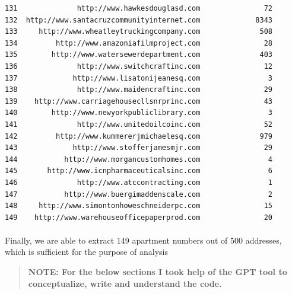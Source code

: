 \documentclass[
  12pt,
]{article}
\makeatletter
\let\oldparagraph\paragraph
\renewcommand{\paragraph}{
    \@ifstar
      \xxxParagraphStar
      \xxxParagraphNoStar
  }
\newcommand{\xxxParagraphStar}[1]{\oldparagraph*{#1}\mbox{}}
\newcommand{\xxxParagraphNoStar}[1]{\oldparagraph{#1}\mbox{}}
\makeatother
\begin{document}
\begin{verbatim}
131              http://www.hawkesdouglasd.com               72
132  http://www.santacruzcommunityinternet.com             8343
133     http://www.wheatleytruckingcompany.com              508
134         http://www.amazoniafilmproject.com               28
135        http://www.watersewerdepartment.com              403
136              http://www.switchcraftinc.com               12
137             http://www.lisatonijeanesq.com                3
138              http://www.maidencraftinc.com               29
139    http://www.carriagehousecllsnrprinc.com               43
140        http://www.newyorkpubliclibrary.com                3
141              http://www.unitedoilcoinc.com               52
142         http://www.kummererjmichaelesq.com              979
143             http://www.stofferjamesmjr.com               29
144           http://www.morgancustomhomes.com                4
145       http://www.icnpharmaceuticalsinc.com                6
146              http://www.atccontracting.com                1
147           http://www.buergimaddenscale.com                2
148     http://www.simontonhoweschneiderpc.com               15
149    http://www.warehouseofficepaperprod.com               20
\end{verbatim}

\paragraph{Finally, we are able to extract 149 apartment numbers out of
500 addresses, which is sufficient for the purpose of
analysis}\label{finally-we-are-able-to-extract-149-apartment-numbers-out-of-500-addresses-which-is-sufficient-for-the-purpose-of-analysis}

\begin{quote}
\textbf{NOTE: For the below sections I took help of the GPT tool to
conceptualize, write and understand the code.}
\end{quote}
\end{document}
